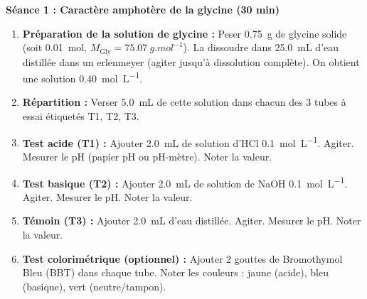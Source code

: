 \documentclass[11pt]{article}
\newcommand{\cle}[1]{{\popxbold\color{popdark}#1}}
\newcounter{popsec}
\newcounter{popsub}
\newcommand{\courssub}[1]{%
  \stepcounter{popsub}%
  \par\vspace{9pt}\noindent{\popxbold\fontsize{11.5}{13}\selectfont\color{popink}{\color{poporange}\thepopsec.\thepopsub}\hspace{6pt}#1}\par\nopagebreak\vspace{4pt}
}
\begin{document}
\courssub{Protocole}
\textbf{Séance 1 : Caractère amphotère de la glycine (30 min)}
\begin{enumerate}
    \item \textbf{Préparation de la solution de glycine :} Peser \SI{0,75}{g} de glycine solide (soit \SI{0,01}{mol}, $M_{\text{Gly}} = \SI{75,07}{g.mol^{-1}}$). La dissoudre dans \SI{25,0}{mL} d'eau distillée dans un erlenmeyer (agiter jusqu'à dissolution complète). On obtient une solution \SI{0,40}{mol.L^{-1}}.
    \item \textbf{Répartition :} Verser \SI{5,0}{mL} de cette solution dans chacun des 3 tubes à essai étiquetés T1, T2, T3.
    \item \textbf{Test acide (T1) :} Ajouter \SI{2,0}{mL} de solution d'HCl \SI{0,1}{mol.L^{-1}}. Agiter. Mesurer le pH (papier pH ou pH-mètre). Noter la valeur.
    \item \textbf{Test basique (T2) :} Ajouter \SI{2,0}{mL} de solution de NaOH \SI{0,1}{mol.L^{-1}}. Agiter. Mesurer le pH. Noter la valeur.
    \item \textbf{Témoin (T3) :} Ajouter \SI{2,0}{mL} d'eau distillée. Agiter. Mesurer le pH. Noter la valeur.
    \item \textbf{Test colorimétrique (optionnel) :} Ajouter 2 gouttes de \cle{Bromothymol Bleu (BBT)} dans chaque tube. Noter les couleurs : jaune (acide), bleu (basique), vert (neutre/tampon).
\end{enumerate}
\end{document}
